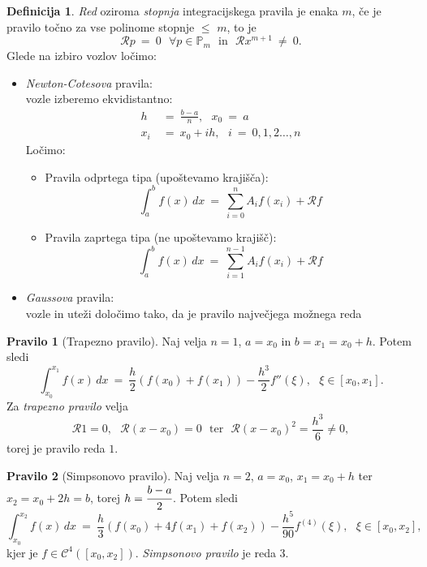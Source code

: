 \documentclass[11pt]{article}
\newcommand{\p}{\mathbb{P}}
\newcommand{\C}{\mathcal{C}}
\newcommand{\rr}{\mathcal{R}}
\theoremstyle{definition}
\newtheorem{definicija}{Definicija}[section]
\theoremstyle{definition}
\newtheorem*{pravilo}{Pravilo}
\begin{document}
\begin{definicija}

\textit{Red} oziroma \textit{stopnja} integracijskega pravila je enaka $m$, če je pravilo točno za vse polinome stopnje $\leq$ $m$, to je
$$\rr p ~=~ 0 ~~~\forall p \in \p_m ~~~\text{in}~~~ \rr x^{m+1} ~\neq~ 0.$$
Glede na izbiro vozlov ločimo:
\begin{itemize}

	\item \textit{Newton-Cotesova} pravila: \\vozle izberemo ekvidistantno:
	\begin{align*}
	h ~&=~ \frac{b-a}{n}, ~~~x_0 ~=~ a \\
	x_i ~&=~ x_0 + ih, ~~~i ~=~ 0, 1, 2 \ldots, n
	\end{align*}	
	Ločimo:
	\begin{itemize}
		\item Pravila odprtega tipa (upoštevamo krajišča):
		$$\int_a^b f(x)\,dx ~=~ \sum_{i=0}^n A_i f(x_i) + \rr f$$
		\item Pravila zaprtega tipa (ne upoštevamo krajišč):
		$$\int_a^b f(x)\,dx ~=~ \sum_{i=1}^{n-1} A_i f(x_i) + \rr f$$
	\end{itemize}
	
	\item \textit{Gaussova} pravila: \\
	vozle in uteži določimo tako, da je pravilo največjega možnega reda

\end{itemize}

\end{definicija}
\vspace{0.5cm}

\begin{pravilo}[Trapezno pravilo]

Naj velja $n = 1$, $a = x_0$ in $b = x_1 = x_0 + h$. Potem sledi
$$\int_{x_0}^{x_1} f(x)\,dx ~=~ \frac{h}{2}(f(x_0) + f(x_1)) - \frac{h^3}{2}f''(\xi), ~~~\xi \in [x_0, x_1].$$
Za \textit{trapezno pravilo} velja 
$$\rr 1 = 0, ~~~\rr (x-x_0) = 0 ~~~\text{ter}~~~ \rr (x-x_0)^2 = \frac{h^3}{6} \neq 0,$$
torej je pravilo reda $1$. 

\end{pravilo}
\vspace{0.5cm}

\begin{pravilo}[Simpsonovo pravilo]

Naj velja $n = 2$, $a = x_0$, $x_1 = x_0 + h$ ter $x_2 = x_0 + 2h = b$, torej $h = \cfrac{b-a}{2}$. Potem sledi
$$\int_{x_0}^{x_2} f(x)\,dx ~=~ \frac{h}{3} (f(x_0) + 4f(x_1) + f(x_2)) - \frac{h^5}{90} f^{(4)}(\xi), ~~~\xi \in [x_0, x_2],$$ 
kjer je $f \in \C^4([x_0, x_2])$. \textit{Simpsonovo pravilo} je reda $3$.

\end{pravilo}
\vspace{0.5cm}
\end{document}
